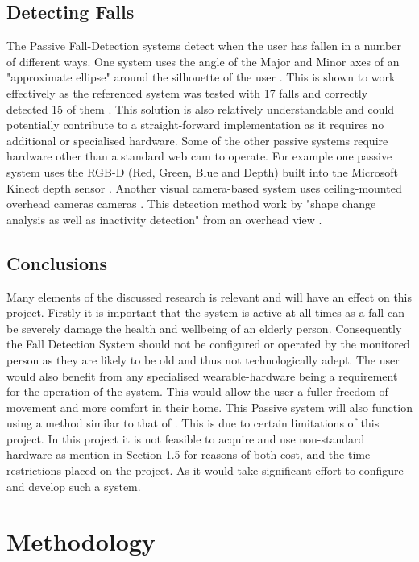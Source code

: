 \documentclass[11pt,a4paper]{report}
\begin{document}
\section{Detecting Falls}
The Passive Fall-Detection systems detect when the user has fallen in a number of different ways. One system uses the angle of the Major and Minor axes of an "approximate ellipse" around the silhouette of the user \citep{rougier2007fall}. This is shown to work effectively as the referenced system was tested with 17 falls and correctly detected 15 of them \citep{rougier2007fall}. This solution is also relatively understandable and could potentially contribute to a straight-forward implementation as it requires no additional or specialised hardware. Some of the other passive systems require hardware other than a standard web cam to operate. For example one passive system uses the RGB-D (Red, Green, Blue and Depth) built into the Microsoft Kinect depth sensor \citep{kinectPassiveDetection}. Another visual camera-based system uses ceiling-mounted overhead cameras cameras \citep{nait2004activity}. This detection method work by "shape change analysis as well as inactivity detection" from an overhead view \citep{fallDetectionInvestigation}.

\section{Conclusions}
Many elements of the discussed research is relevant and will have an effect on this project. Firstly it is important that the system is active at all times as a fall can be severely damage the health and wellbeing of an elderly person. Consequently the Fall Detection System should not be configured or operated by the monitored person as they are likely to be old and thus not technologically adept. The user would also benefit from any specialised wearable-hardware being a requirement for the operation of the system. This would allow the user a fuller freedom of movement and more comfort in their home.
This Passive system will also function using a method similar to that of \cite{rougier2007fall}. This is due to certain limitations of this project. In this project it is not feasible to acquire and use non-standard hardware as mention in Section 1.5 for reasons of both cost, and the time restrictions placed on the project. As it would take significant effort to configure and develop such a system.

\chapter{Methodology}
\end{document}
